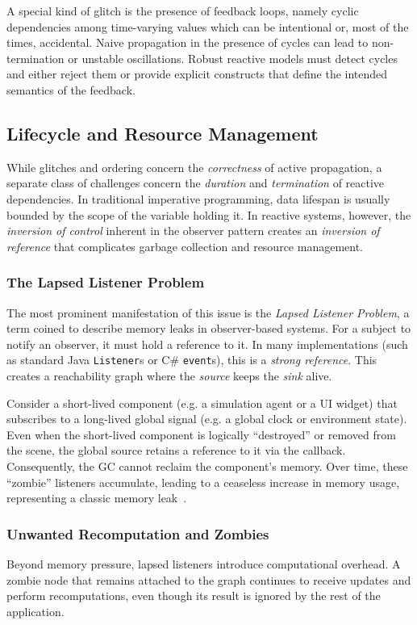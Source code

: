 A special kind of glitch is the presence of feedback loops, namely cyclic
dependencies among time-varying values which can be intentional or, most of the
times, accidental. Naive propagation in the presence of cycles can lead to
non-termination or unstable oscillations. Robust reactive models must detect
cycles and either reject them or provide explicit constructs that define the
intended semantics of the feedback.

\subsection{Lifecycle and Resource Management}\label{ssec:react_lifecycle}
While glitches and ordering concern the \emph{correctness} of active
propagation, a separate class of challenges concern the \emph{duration} and
\emph{termination} of reactive dependencies. In traditional imperative
programming, data lifespan is usually bounded by the scope of the variable
holding it. In reactive systems, however, the \emph{inversion of control}
inherent in the observer pattern creates an \emph{inversion of reference} that
complicates garbage collection and resource management.

\subsubsection{The Lapsed Listener Problem}
The most prominent manifestation of this issue is the \emph{Lapsed Listener
	Problem}, a term coined to describe memory leaks in observer-based systems. For
a subject to notify an observer, it must hold a reference to it. In many
implementations (such as standard Java \texttt{Listener}s or C\#
\texttt{event}s), this is a \emph{strong reference}. This creates a
reachability graph where the \emph{source} keeps the \emph{sink} alive.

Consider a short-lived component (e.g. a simulation agent or a UI widget) that
subscribes to a long-lived global signal (e.g. a global clock or environment
state). Even when the short-lived component is logically ``destroyed'' or
removed from the scene, the global source retains a reference to it via the
callback. Consequently, the \ac{GC} cannot reclaim the component's memory. Over
time, these ``zombie'' listeners accumulate, leading to a ceaseless increase in
memory usage, representing a classic memory leak~\cite{maier2010DOP}.

\subsubsection{Unwanted Recomputation and Zombies}
Beyond memory pressure, lapsed listeners introduce computational overhead. A
zombie node that remains attached to the graph continues to receive updates
and perform recomputations, even though its result is ignored by the rest of
the application.


